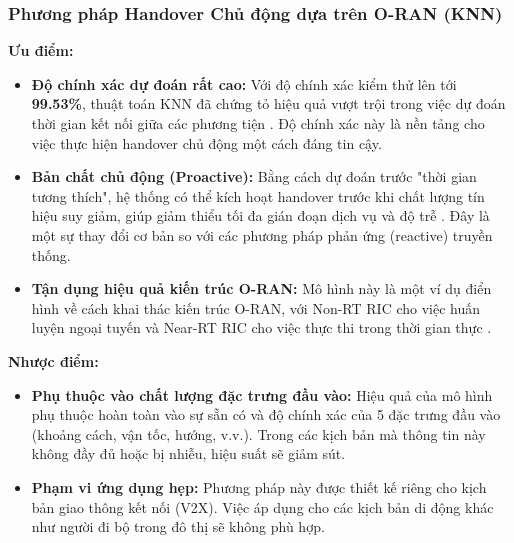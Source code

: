 \documentclass{article} %
\begin{document}
\subsubsection{Phương pháp Handover Chủ động dựa trên O-RAN (KNN)}
\textbf{Ưu điểm:}
\begin{itemize}
    \item \textbf{Độ chính xác dự đoán rất cao:} Với độ chính xác kiểm thử lên tới \textbf{99.53\%}, thuật toán KNN đã chứng tỏ hiệu quả vượt trội trong việc dự đoán thời gian kết nối giữa các phương tiện . Độ chính xác này là nền tảng cho việc thực hiện handover chủ động một cách đáng tin cậy.
    \item \textbf{Bản chất chủ động (Proactive):} Bằng cách dự đoán trước "thời gian tương thích", hệ thống có thể kích hoạt handover trước khi chất lượng tín hiệu suy giảm, giúp giảm thiểu tối đa gián đoạn dịch vụ và độ trễ . Đây là một sự thay đổi cơ bản so với các phương pháp phản ứng (reactive) truyền thống.
    \item \textbf{Tận dụng hiệu quả kiến trúc O-RAN:} Mô hình này là một ví dụ điển hình về cách khai thác kiến trúc O-RAN, với Non-RT RIC cho việc huấn luyện ngoại tuyến và Near-RT RIC cho việc thực thi trong thời gian thực .
\end{itemize}
\textbf{Nhược điểm:}
\begin{itemize}
    \item \textbf{Phụ thuộc vào chất lượng đặc trưng đầu vào:} Hiệu quả của mô hình phụ thuộc hoàn toàn vào sự sẵn có và độ chính xác của 5 đặc trưng đầu vào (khoảng cách, vận tốc, hướng, v.v.). Trong các kịch bản mà thông tin này không đầy đủ hoặc bị nhiễu, hiệu suất sẽ giảm sút.
    \item \textbf{Phạm vi ứng dụng hẹp:} Phương pháp này được thiết kế riêng cho kịch bản giao thông kết nối (V2X). Việc áp dụng cho các kịch bản di động khác như người đi bộ trong đô thị sẽ không phù hợp.
\end{itemize}
\end{document}
